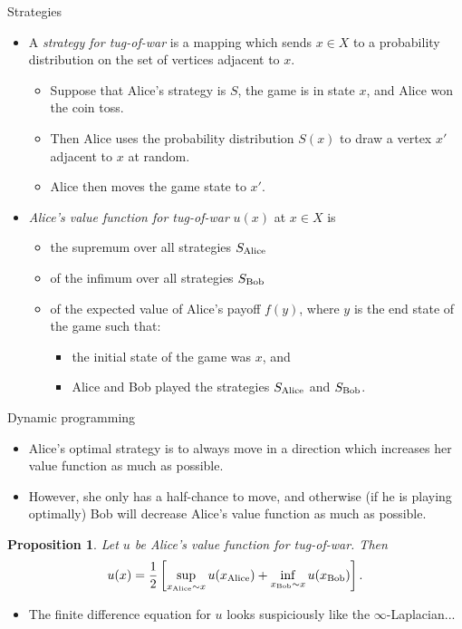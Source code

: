 \documentclass[10pt]{beamer}
\newtheorem{proposition}{Proposition}
\begin{document}
\begin{frame}{Strategies}
\begin{itemize}
\item A \emph{strategy for tug-of-war} is a mapping which sends $x \in X$ to a probability distribution on the set of vertices adjacent to $x$. 
\begin{itemize} 
\item Suppose that Alice's strategy is $S$, the game is in state $x$, and Alice won the coin toss. 
\item Then Alice uses the probability distribution $S(x)$ to draw a vertex $x'$ adjacent to $x$ at random.
\item Alice then moves the game state to $x'$. 
\end{itemize}
\item \emph{Alice's value function for tug-of-war} $u(x)$ at $x \in X$ is
\begin{itemize}
\item the supremum over all strategies $S_{\rm Alice}$
\item of the infimum over all strategies $S_{\rm Bob}$
\item of the expected value of Alice's payoff $f(y)$, where $y$ is the end state of the game such that:
\begin{itemize}
\item the initial state of the game was $x$, and
\item Alice and Bob played the strategies $S_{\rm Alice}$ and $S_{\rm Bob}$.
\end{itemize}
\end{itemize}
\end{itemize}
\end{frame}

\begin{frame}{Dynamic programming}
\begin{itemize}
\item Alice's optimal strategy is to always move in a direction which increases her value function as much as possible. 
\item However, she only has a half-chance to move, and otherwise (if he is playing optimally) Bob will decrease Alice's value function as much as possible.  
\end{itemize}

\begin{proposition}
Let $u$ be Alice's value function for tug-of-war. Then 
$$u(x) = \frac{1}{2} \left[\sup_{x_{\rm Alice} \sim x} u(x_{\rm Alice}) + \inf_{x_{\rm Bob} \sim x} u(x_{\rm Bob})\right].$$
\end{proposition}  

\begin{itemize}
\item The finite difference equation for $u$ looks suspiciously like the $\infty$-Laplacian... 
\end{itemize}
\end{frame}
\end{document}
